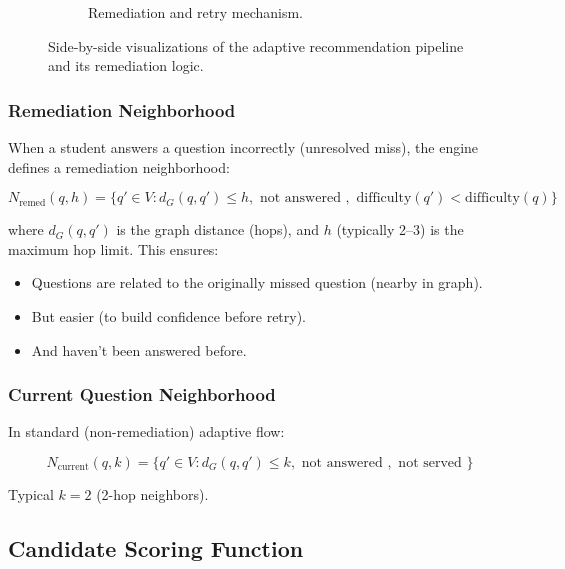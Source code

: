 \documentclass[sigconf,authordraft,twoside]{acmart}
\begin{document}
\begin{figure}[t]
\begin{subfigure}[t]{0.48\textwidth}
\caption{Remediation and retry mechanism.}
\end{subfigure}
\caption{Side-by-side visualizations of the adaptive recommendation pipeline and its remediation logic.}
\end{figure}

\subsubsection{Remediation Neighborhood}
When a student answers a question incorrectly (unresolved miss), the engine defines a remediation neighborhood:

\begin{equation}
N_{\text{remed}}(q, h) = \{q' \in V : d_G(q, q') \leq h, \text{ not answered }, \text{ difficulty}(q') < \text{difficulty}(q)\}
\end{equation}

where $d_G(q, q')$ is the graph distance (hops), and $h$ (typically 2--3) is the maximum hop limit. This ensures:
\begin{itemize}
\item Questions are related to the originally missed question (nearby in graph).
\item But easier (to build confidence before retry).
\item And haven't been answered before.
\end{itemize}

\subsubsection{Current Question Neighborhood}
In standard (non-remediation) adaptive flow:

\begin{equation}
N_{\text{current}}(q, k) = \{q' \in V : d_G(q, q') \leq k, \text{ not answered }, \text{ not served }\}
\end{equation}

Typical $k = 2$ (2-hop neighbors).

\subsection{Candidate Scoring Function}
\end{document}
